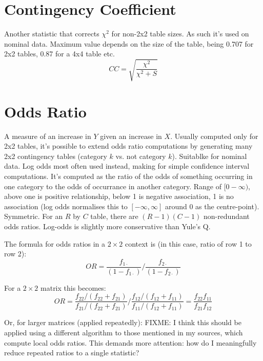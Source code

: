 \documentclass[11pt]{article}
\begin{document}
\section{Contingency Coefficient}
Another statistic that corrects $\chi^2$ for non-2x2 table sizes.  As such it's used on nominal data.  Maximum value depends on the size of the table, being 0.707 for 2x2 tables, 0.87 for a 4x4 table etc.  
$$
CC = \sqrt{ \frac{ \chi^2 }{ \chi^2 + S } }
$$




\section{Odds Ratio}
\label{section:oddsratio}
A measure of an increase in $Y$ given an increase in $X$. %
Usually computed only for 2x2 tables, it's possible to extend odds ratio computations by generating many 2x2 contingency tables (category $k$ vs. not category $k$).  Suitablke for nominal data.  %
Log odds most often used instead, making for simple confidence interval computations.  It's computed as the ratio of the odds of something occurring in one category to the odds of occurrance in another category.  Range of $[0-\infty)$, above one is positive relationship, below 1 is negative association, 1 is no association (log odds normalises this to $[-\infty, \infty]$ around 0 as the centre-point).  Symmetric.  For an $R$ by $C$ table, there are $(R-1)(C-1)$ non-redundant odds ratios.  Log-odds is slightly more conservative than Yule's Q.

The formula for odds ratios in a $2\times 2$ context is (in this case, ratio of row 1 to row 2):
$$
OR = {   \frac{ f_{1\cdot} }{ (1-f_{1\cdot}) }   \bigg /  \frac{ f_{2\cdot} }{ (1-f_{2\cdot}) }        }
$$

For a $2\times 2$ matrix this becomes:
$$
OR = { \dfrac{f_{22}/(f_{22}+f_{21})}{f_{21}/(f_{22}+f_{21})} \bigg / \dfrac{f_{12}/(f_{12}+f_{11})}{f_{11}/(f_{12}+f_{11})}} = \dfrac{f_{22}f_{11}}{f_{21}f_{12}}
$$


Or, for larger matrices (applied repeatedly):
FIXME: I think this should be applied using a different algorithm to those mentioned in my sources, which compute local odds ratios.  This demands more attention: how do I meaningfully reduce repeated ratios to a single statistic?
\end{document}
